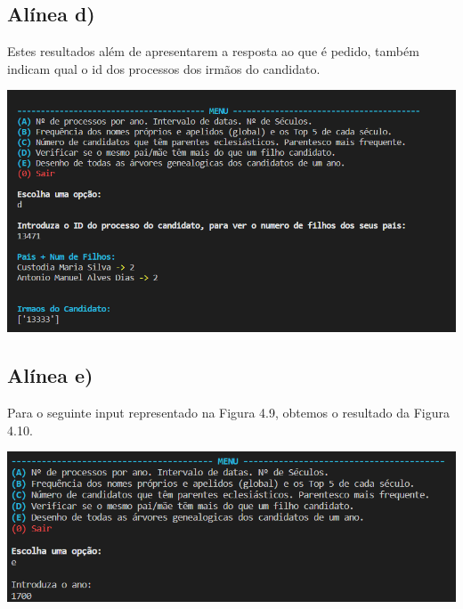 \documentclass[11pt,a4paper]{report}
\begin{document}
\vspace{2.5cm}


\subsection*{ Alínea d)}

\qquad Estes resultados além de apresentarem a resposta ao que é pedido, também indicam qual o id dos processos dos irmãos do candidato.

\begin{center}
	\includegraphics[scale=0.7]{images/d1}
	\end{center}
\newpage
\subsection*{ Alínea e)}


\qquad Para o seguinte input representado na Figura 4.9, obtemos o resultado da Figura 4.10.

\begin{center}
	\includegraphics[scale=0.5]{images/e1}
	\end{center}
\end{document}
